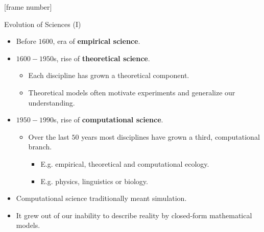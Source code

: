 \documentclass[aspectratio=169,t]{beamer}
\begin{document}
  {
    [frame number]
    \begin{frame}{Evolution of Sciences (I)}
        \begin{itemize}
            \item Before $1600$, era of \textbf{empirical science}.
            \item $1600-1950$s, rise of \textbf{theoretical science}.
                  \begin{itemize}
                      \item Each discipline has grown a theoretical component.
                      \item Theoretical models often motivate experiments and generalize our understanding.
                  \end{itemize}
            \item $1950-1990$s, rise of \textbf{computational science}.
                  \begin{itemize}
                      \item Over the last $50$ years most disciplines have grown a third, computational branch.
                      \begin{itemize}
                          \item E.g. empirical, theoretical and computational ecology.
                          \item E.g. physics, linguistics or biology.
                      \end{itemize}
                  \end{itemize}
            \item Computational science traditionally meant simulation.
            \item It grew out of our inability to describe reality by closed-form mathematical models.
        \end{itemize}
    \end{frame}
  }
\end{document}

